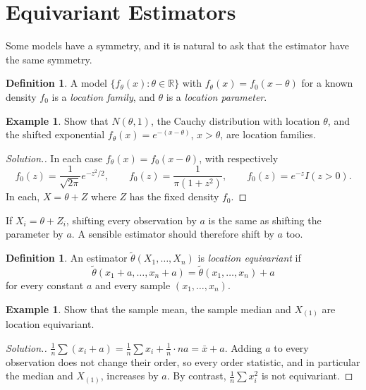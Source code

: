 \documentclass[12pt,a4paper]{report}
\theoremstyle{definition}
\newtheorem{defn}[thm]{Definition}
\newtheorem{exa}[thm]{Example}
\newenvironment{solution}
  {\renewcommand{\qedsymbol}{}\begin{proof}[\textit{Solution}.]}
  {\end{proof}}
\begin{document}
\section{Equivariant Estimators}

Some models have a symmetry, and it is natural to ask that the estimator have the
same symmetry.

\begin{defn}
\label{def:locationfamily}
A model $\{f_\theta(x) : \theta\in\mathbb{R}\}$ with $f_\theta(x) = f_0(x - \theta)$ for a
known density $f_0$ is a \emph{location family}, and $\theta$ is a \emph{location
parameter}.
\end{defn}

\begin{exa}
\label{ex:locationfamilies}
Show that $N(\theta, 1)$, the Cauchy distribution with location $\theta$, and the
shifted exponential $f_\theta(x) = e^{-(x - \theta)}$, $x>\theta$, are location families.
\end{exa}

\begin{solution}
In each case $f_\theta(x) = f_0(x - \theta)$, with respectively
\[f_0(z) = \frac{1}{\sqrt{2\pi}}e^{-z^2/2},\qquad
f_0(z) = \frac{1}{\pi(1 + z^2)},\qquad
f_0(z) = e^{-z}I(z>0) .\]
In each, $X = \theta + Z$ where $Z$ has the fixed density $f_0$.
\end{solution}

If $X_i = \theta + Z_i$, shifting every observation by $a$ is the same as shifting the
parameter by $a$. A sensible estimator should therefore shift by $a$ too.

\begin{defn}
\label{def:locationequivariant}
An estimator $\tilde\theta(X_1, \dots, X_n)$ is \emph{location equivariant} if
\[\tilde\theta(x_1 + a, \dots, x_n + a) = \tilde\theta(x_1, \dots, x_n) + a\]
for every constant $a$ and every sample $(x_1, \dots, x_n)$.
\end{defn}

\begin{exa}
\label{ex:meanequivariant}
Show that the sample mean, the sample median and $X_{(1)}$ are location equivariant.
\end{exa}

\begin{solution}
$\frac1n\sum(x_i + a) = \frac1n\sum x_i + \frac1n\cdot na = \bar x + a$. Adding $a$ to
every observation does not change their order, so every order statistic, and in
particular the median and $X_{(1)}$, increases by $a$. By contrast,
$\frac1n\sum x_i^2$ is not equivariant.
\end{solution}
\end{document}
